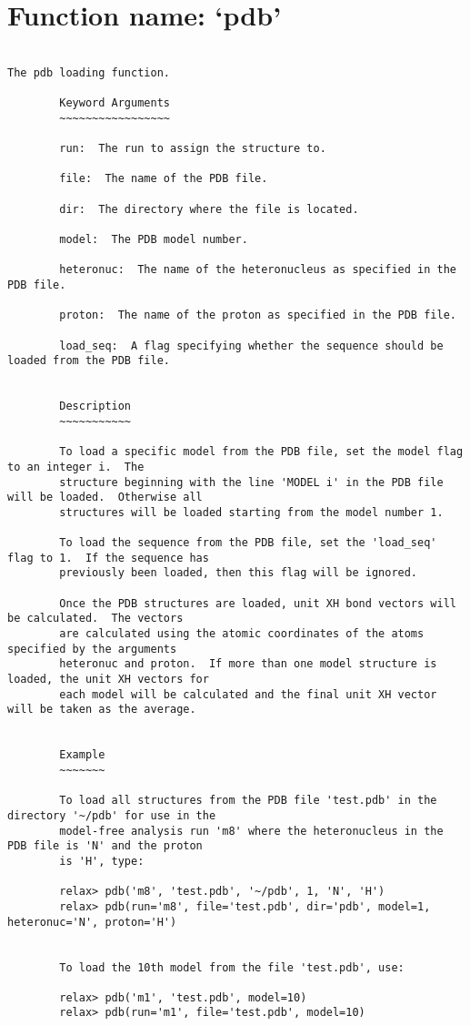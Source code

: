 \normalsize
\section{Function name: `pdb'}

\scriptsize
\begin{verbatim}

The pdb loading function.

        Keyword Arguments
        ~~~~~~~~~~~~~~~~~

        run:  The run to assign the structure to.

        file:  The name of the PDB file.

        dir:  The directory where the file is located.

        model:  The PDB model number.

        heteronuc:  The name of the heteronucleus as specified in the PDB file.

        proton:  The name of the proton as specified in the PDB file.

        load_seq:  A flag specifying whether the sequence should be loaded from the PDB file.


        Description
        ~~~~~~~~~~~

        To load a specific model from the PDB file, set the model flag to an integer i.  The
        structure beginning with the line 'MODEL i' in the PDB file will be loaded.  Otherwise all
        structures will be loaded starting from the model number 1.

        To load the sequence from the PDB file, set the 'load_seq' flag to 1.  If the sequence has
        previously been loaded, then this flag will be ignored.

        Once the PDB structures are loaded, unit XH bond vectors will be calculated.  The vectors
        are calculated using the atomic coordinates of the atoms specified by the arguments
        heteronuc and proton.  If more than one model structure is loaded, the unit XH vectors for
        each model will be calculated and the final unit XH vector will be taken as the average.


        Example
        ~~~~~~~

        To load all structures from the PDB file 'test.pdb' in the directory '~/pdb' for use in the
        model-free analysis run 'm8' where the heteronucleus in the PDB file is 'N' and the proton
        is 'H', type:

        relax> pdb('m8', 'test.pdb', '~/pdb', 1, 'N', 'H')
        relax> pdb(run='m8', file='test.pdb', dir='pdb', model=1, heteronuc='N', proton='H')


        To load the 10th model from the file 'test.pdb', use:

        relax> pdb('m1', 'test.pdb', model=10)
        relax> pdb(run='m1', file='test.pdb', model=10)

        
\end{verbatim}


